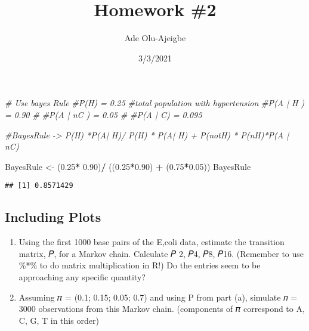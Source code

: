 \documentclass[
]{article}
\title{Homework \#2}
\author{Ade Olu-Ajeigbe}
\date{3/3/2021}
\newenvironment{Shaded}{\begin{snugshade}}{\end{snugshade}}
\newcommand{\CommentTok}[1]{\textcolor[rgb]{0.56,0.35,0.01}{\textit{#1}}}
\newcommand{\FloatTok}[1]{\textcolor[rgb]{0.00,0.00,0.81}{#1}}
\newcommand{\NormalTok}[1]{#1}
\newcommand{\OperatorTok}[1]{\textcolor[rgb]{0.81,0.36,0.00}{\textbf{#1}}}
\newcommand{\StringTok}[1]{\textcolor[rgb]{0.31,0.60,0.02}{#1}}
\providecommand{\tightlist}{%
  \setlength{\itemsep}{0pt}\setlength{\parskip}{0pt}}
\begin{document}
\maketitle

\begin{Shaded}
\begin{Highlighting}[]
\CommentTok{# Use bayes Rule}
\CommentTok{#P(H) = 0.25 #total population with hypertension}
\CommentTok{#P(A | H ) = 0.90 #}
\CommentTok{#P(A | nC ) = 0.05 #}
\CommentTok{#P(A | C) = 0.095}

\CommentTok{#BayesRule -> P(H) *P(A| H)/ P(H) * P(A| H) + P(notH) * P(nH)*P(A | nC)}

\NormalTok{BayesRule <-}\StringTok{ }\NormalTok{(}\FloatTok{0.25}\OperatorTok{*}\StringTok{ }\FloatTok{0.90}\NormalTok{)}\OperatorTok{/}\StringTok{ }\NormalTok{((}\FloatTok{0.25}\OperatorTok{*}\FloatTok{0.90}\NormalTok{) }\OperatorTok{+}\StringTok{ }\NormalTok{(}\FloatTok{0.75}\OperatorTok{*}\FloatTok{0.05}\NormalTok{))}
\NormalTok{BayesRule}
\end{Highlighting}
\end{Shaded}

\begin{verbatim}
## [1] 0.8571429
\end{verbatim}

\hypertarget{including-plots}{%
\subsection{Including Plots}\label{including-plots}}

\begin{enumerate}
\def\labelenumi{(\alph{enumi})}
\tightlist
\item
  Using the first 1000 base pairs of the E,coli data, estimate the
  transition matrix, 𝑃, for a Markov chain. Calculate 𝑃 2, 𝑃4, 𝑃8, 𝑃16.
  (Remember to use \%*\% to do matrix multiplication in R!) Do the
  entries seem to be approaching any specific quantity?
\item
  Assuming 𝜋 = (0.1; 0.15; 0.05; 0.7) and using P from part (a),
  simulate 𝑛 = 3000 observations from this Markov chain. (components of
  𝜋 correspond to A, C, G, T in this order)
\end{enumerate}
\end{document}
